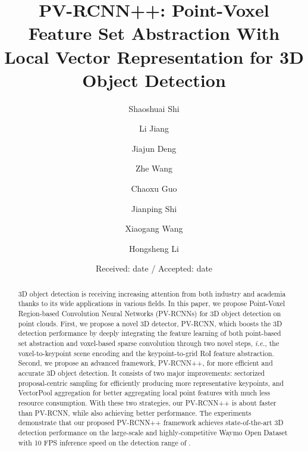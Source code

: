 \documentclass[natbib,twocolumn]{svjour3}          \smartqed  \usepackage{graphicx}
\begin{document}
\title{PV-RCNN++: Point-Voxel Feature Set Abstraction With Local Vector Representation for 3D  Object Detection
}

\author{Shaoshuai Shi \and Li Jiang \and Jiajun Deng \and Zhe Wang \and Chaoxu Guo \and Jianping Shi \and Xiaogang Wang \and Hongsheng Li
}




\date{Received: date / Accepted: date}



\maketitle

\begin{abstract}
3D object detection is receiving increasing attention from both industry and academia thanks to its wide applications in various fields. In this paper, we propose Point-Voxel Region-based Convolution Neural Networks (PV-RCNNs) for 3D object detection on point clouds. First, we propose a novel 3D detector, PV-RCNN, which boosts the 3D detection performance by deeply integrating the feature learning of both point-based set abstraction and voxel-based sparse convolution through two novel steps, \emph{i.e.}, the voxel-to-keypoint scene encoding and the keypoint-to-grid RoI feature abstraction. Second, we propose an advanced framework, PV-RCNN++, for more efficient and accurate 3D object detection. It consists of two major improvements: sectorized proposal-centric sampling for efficiently producing more representative keypoints, and VectorPool aggregation for better aggregating local point features with much less resource consumption. With these two strategies, our PV-RCNN++ is about  faster than PV-RCNN, while also achieving better performance. The experiments demonstrate that our proposed PV-RCNN++ framework achieves state-of-the-art 3D detection performance on the large-scale and highly-competitive Waymo Open Dataset with 10 FPS inference speed on the detection range of .  


\end{abstract}
\end{document}
